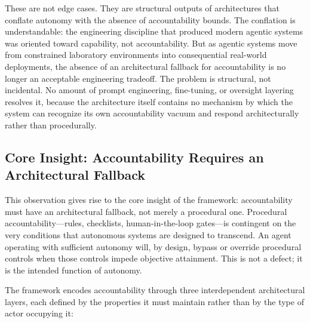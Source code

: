 These are not edge cases. They are structural outputs of architectures that conflate autonomy with the absence of accountability bounds. The conflation is understandable: the engineering discipline that produced modern agentic systems was oriented toward capability, not accountability. But as agentic systems move from constrained laboratory environments into consequential real-world deployments, the absence of an architectural fallback for accountability is no longer an acceptable engineering tradeoff. The problem is structural, not incidental. No amount of prompt engineering, fine-tuning, or oversight layering resolves it, because the architecture itself contains no mechanism by which the system can recognize its own accountability vacuum and respond architecturally rather than procedurally.

\subsection{Core Insight: Accountability Requires an Architectural Fallback}

This observation gives rise to the core insight of the \bxthree framework: accountability must have an architectural fallback, not merely a procedural one. Procedural accountability—rules, checklists, human-in-the-loop gates—is contingent on the very conditions that autonomous systems are designed to transcend. An agent operating with sufficient autonomy will, by design, bypass or override procedural controls when those controls impede objective attainment. This is not a defect; it is the intended function of autonomy.

The \bxthree framework encodes accountability through three interdependent architectural layers, each defined by the properties it must maintain rather than by the type of actor occupying it:

